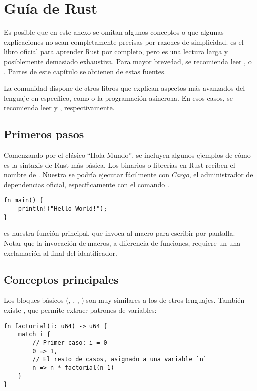 \chapter{Guía de Rust}\label{annex:rust}

Es posible que en este anexo se omitan algunos conceptos o que algunas
explicaciones no sean completamente precisas por razones de simplicidad.
 es el libro oficial para aprender Rust por completo, pero es
una lectura larga y posiblemente demasiado exhaustiva. Para mayor brevedad, se
recomienda leer ,  o
. Partes de este capítulo se obtienen de estas fuentes.

La comunidad dispone de otros libros que explican aspectos más avanzados del
lenguaje en específico, como \unsafe o la programación asíncrona. En esos casos,
se recomienda leer  y ,
respectivamente.

\section{Primeros pasos}

Comenzando por el clásico ``Hola Mundo'', se incluyen algunos ejemplos de cómo
es la sintaxis de Rust más básica. Los binarios o librerías en Rust reciben el
nombre de \crate. Nuestra \crate se podría ejecutar fácilmente con \emph{Cargo},
el administrador de dependencias oficial, específicamente con el comando
.

\begin{verbatim}
fn main() {
    println!("Hello World!");
}
\end{verbatim}

 es nuestra función principal, que invoca al macro 
para escribir por pantalla. Notar que la invocación de macros, a diferencia de
funciones, requiere un una exclamación al final del identificador.

\section{Conceptos principales}

Los bloques básicos (, , , ) son muy
similares a los de otros lenguajes. También existe , que permite
extraer patrones de variables:

\begin{verbatim}
fn factorial(i: u64) -> u64 {
    match i {
        // Primer caso: i = 0
        0 => 1,
        // El resto de casos, asignado a una variable `n`
        n => n * factorial(n-1)
    }
}
\end{verbatim}


